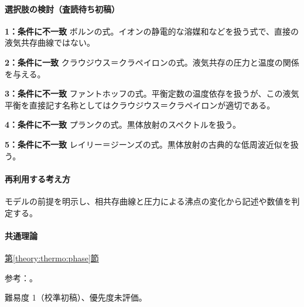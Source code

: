 \paragraph{選択肢の検討（査読待ち初稿）}\mbox{}\par

\noindent\textbf{1：条件に不一致} ボルンの式。イオンの静電的な溶媒和などを扱う式で、直接の液気共存曲線ではない。\par

\noindent\textbf{2：条件に一致} クラウジウス＝クラペイロンの式。液気共存の圧力と温度の関係を与える。\par

\noindent\textbf{3：条件に不一致} ファントホッフの式。平衡定数の温度依存を扱うが、この液気平衡を直接記す名称としてはクラウジウス＝クラペイロンが適切である。\par

\noindent\textbf{4：条件に不一致} プランクの式。黒体放射のスペクトルを扱う。\par

\noindent\textbf{5：条件に不一致} レイリー＝ジーンズの式。黒体放射の古典的な低周波近似を扱う。\par

\paragraph{再利用する考え方} モデルの前提を明示し、相共存曲線と圧力による沸点の変化から記述や数値を判定する。

\paragraph{共通理論} \hyperref[theory:thermo:phase]{第\ref*{theory:thermo:phase}節}

\par 参考：\cite{mit_clapeyron2008}。

\par 難易度 1（校準初稿）、優先度未評価。
